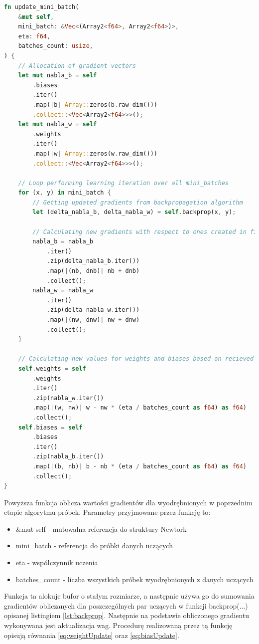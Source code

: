 \documentclass[12pt,twoside]{article}
\begin{document}
\begin{lstlisting}[language=Rust,caption=Realizacja funkcji update\_mini\_batch,label={lst:updateMB}]
fn update_mini_batch(
	&mut self,
	mini_batch: &Vec<(Array2<f64>, Array2<f64>)>,
	eta: f64,
	batches_count: usize,
) {
	// Allocation of gradient vectors
	let mut nabla_b = self
		.biases
		.iter()
		.map(|b| Array::zeros(b.raw_dim()))
		.collect::<Vec<Array2<f64>>>();
	let mut nabla_w = self
		.weights
		.iter()
		.map(|w| Array::zeros(w.raw_dim()))
		.collect::<Vec<Array2<f64>>>();

	// Loop performing learning iteration over all mini_batches
	for (x, y) in mini_batch {
		// Getting updated gradients from backpropagation algorithm
		let (delta_nabla_b, delta_nabla_w) = self.backprop(x, y);

		// Calculating new gradients with respect to ones created in first steps and also newly calculated ones
		nabla_b = nabla_b
			.iter()
			.zip(delta_nabla_b.iter())
			.map(|(nb, dnb)| nb + dnb)
			.collect();
		nabla_w = nabla_w
			.iter()
			.zip(delta_nabla_w.iter())
			.map(|(nw, dnw)| nw + dnw)
			.collect();
	}

	// Calculating new values for weights and biases based on recieved gradients with respect to batch size and learning rate
	self.weights = self
		.weights
		.iter()
		.zip(nabla_w.iter())
		.map(|(w, nw)| w - nw * (eta / batches_count as f64) as f64)
		.collect();
	self.biases = self
		.biases
		.iter()
		.zip(nabla_b.iter())
		.map(|(b, nb)| b - nb * (eta / batches_count as f64) as f64)
		.collect();
}
\end{lstlisting}
Powyższa funkcja oblicza wartości gradientów dla wyodrębnionych w poprzednim etapie algorytmu próbek.
Parametry przyjmowane przez funkcję to:
\begin{itemize}
	\item &mut self - mutowalna referencja do struktury Newtork
	\item mini\_batch - referencja do próbki danych uczących
	\item eta - współczynnik uczenia
	\item batches\_count - liczba wszystkich próbek wyodrębnionych z danych uczących
\end{itemize}

Funkcja ta alokuje bufor o stałym rozmiarze, a następnie używa go do sumowania gradientów obliczanych dla poszczególnych par uczących w funkcji backprop(...) opisanej listingiem \ref{lst:backprop}.
Następnie na podstawie obliczonego gradientu wykonywana jest aktualizacja wag. Procedurę realizowaną przez tą funkcję opisują równania \ref{eq:weightUpdate} oraz \ref{eq:biasUpdate}.
\end{document}
